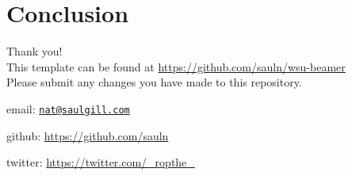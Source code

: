 \documentclass{beamer}
\begin{document}
\section{Conclusion}
\begin{frame}{}
 \begin{center}
  {\huge  Thank you!}  \\
  \vspace{2cm}
  This template can be found at
  \url{https://github.com/sauln/wsu-beamer}\\
  Please submit any changes you have made to this repository.
  \vspace{0.5cm}

  {\tiny  email: \href{mailto:nat@saulgill.com}{\nolinkurl{nat@saulgill.com} }

   github: \url{https://github.com/sauln}

   twitter: \url{https://twitter.com/_ropthe_}

  }
  \mbox{}
 \end{center}
\end{frame}
\end{document}
